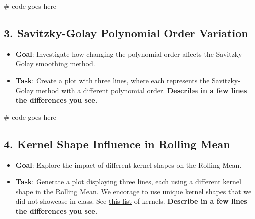 \documentclass[
  letterpaper,
  DIV=11,
  numbers=noendperiod,
  oneside]{scrreprt}
\newenvironment{Shaded}{\begin{snugshade}}{\end{snugshade}}
\newcommand{\CommentTok}[1]{\textcolor[rgb]{0.37,0.37,0.37}{#1}}
\providecommand{\tightlist}{%
  \setlength{\itemsep}{0pt}\setlength{\parskip}{0pt}}\usepackage{longtable,booktabs,array}
\begin{document}
\begin{Shaded}
\begin{Highlighting}[]
\CommentTok{\# code goes here}
\end{Highlighting}
\end{Shaded}

\hypertarget{savitzky-golay-polynomial-order-variation}{%
\subsection{3. Savitzky-Golay Polynomial Order
Variation}\label{savitzky-golay-polynomial-order-variation}}

\begin{itemize}
\tightlist
\item
  \textbf{Goal}: Investigate how changing the polynomial order affects
  the Savitzky-Golay smoothing method.
\item
  \textbf{Task}: Create a plot with three lines, where each represents
  the Savitzky-Golay method with a different polynomial order.
  \textbf{Describe in a few lines the differences you see.}
\end{itemize}

\begin{Shaded}
\begin{Highlighting}[]
\CommentTok{\# code goes here}
\end{Highlighting}
\end{Shaded}

\hypertarget{kernel-shape-influence-in-rolling-mean}{%
\subsection{4. Kernel Shape Influence in Rolling
Mean}\label{kernel-shape-influence-in-rolling-mean}}

\begin{itemize}
\tightlist
\item
  \textbf{Goal}: Explore the impact of different kernel shapes on the
  Rolling Mean.
\item
  \textbf{Task}: Generate a plot displaying three lines, each using a
  different kernel shape in the Rolling Mean. We encorage to use unique
  kernel shapes that we did not showcase in class. See
  \href{https://docs.scipy.org/doc/scipy/reference/signal.windows.html\#module-scipy.signal.windows}{this
  list} of kernels. \textbf{Describe in a few lines the differences you
  see.}
\end{itemize}
\end{document}
